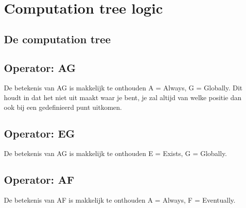 \documentclass{article}%
\begin{document}
\section{Computation tree logic}

\subsection{De computation tree}
\subsection{Operator: AG}
De betekenis van AG is makkelijk te onthouden A = Always, G = Globally. Dit houdt in dat het niet uit maakt waar je bent, je zal altijd van welke positie dan ook bij een gedefinieerd punt uitkomen.

\subsection{Operator: EG}
De betekenis van AG is makkelijk te onthouden E = Exists, G = Globally.

\subsection{Operator: AF}
De betekenis van AF is makkelijk te onthouden A = Always, F = Eventually.
\end{document}
